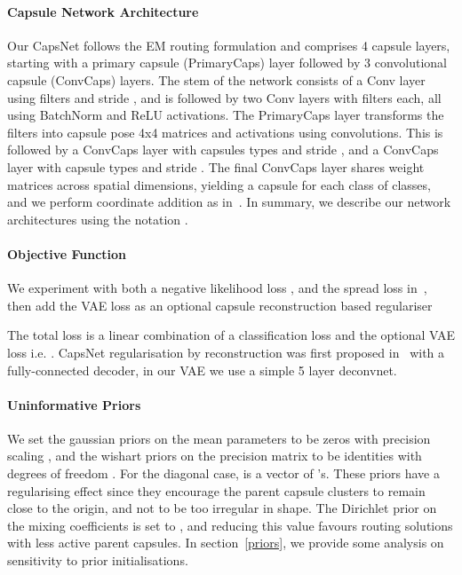 \documentclass[letterpaper]{article} \usepackage{aaai20}  \usepackage{times}  \usepackage{helvet} \usepackage{courier}  \usepackage[hyphens]{url}  \usepackage{graphicx} \urlstyle{rm} \def\UrlFont{\rm}  \usepackage{graphicx}  \frenchspacing  \setlength{\pdfpagewidth}{8.5in}  \setlength{\pdfpageheight}{11in}  \nocopyright
\begin{document}
\paragraph{Capsule Network Architecture}\label{sec: architecture}
Our CapsNet follows the EM routing formulation and comprises 4 capsule layers, starting with a primary capsule ({\selectfont PrimaryCaps}) layer followed by 3 convolutional capsule ({\selectfont ConvCaps}) layers. The stem of the network consists of a  {\selectfont Conv} layer using  filters and stride , and is followed by two  {\selectfont Conv} layers with  filters each, all using {\selectfont BatchNorm} and {\selectfont ReLU} activations. The {\selectfont PrimaryCaps} layer transforms the  filters into  capsule pose 4x4 matrices and  activations using  convolutions. This is followed by a  {\selectfont ConvCaps} layer with  capsules types and stride , and a  {\selectfont ConvCaps} layer with  capsule types and stride . The final {\selectfont ConvCaps} layer shares weight matrices across spatial dimensions, yielding a capsule for each class of  classes, and we perform coordinate addition as in~\cite{hinton2018matrix}. In summary, we describe our network architectures using the notation .
\paragraph{Objective Function}
We experiment with both a negative likelihood loss , and the spread loss  in~\cite{hinton2018matrix}, then add the VAE loss  as an optional capsule reconstruction based regulariser


The total loss is a linear combination of a classification loss and the optional VAE loss i.e. . CapsNet regularisation by reconstruction was first proposed in~\cite{sabour2017dynamic} with a fully-connected decoder, in our VAE we use a simple 5 layer deconvnet.
\paragraph{Uninformative Priors} We set the gaussian priors on the mean parameters  to be zeros with precision scaling , and the wishart priors on the precision matrix  to be identities  with degrees of freedom . For the diagonal case,  is a vector of 's. These priors have a regularising effect since they encourage the parent capsule clusters  to remain close to the origin, and not to be too irregular in shape. The Dirichlet prior on the mixing coefficients  is set to , and reducing this value favours routing solutions with less active parent capsules. In section~\ref{priors}, we provide some analysis on sensitivity to prior initialisations.
\end{document}
